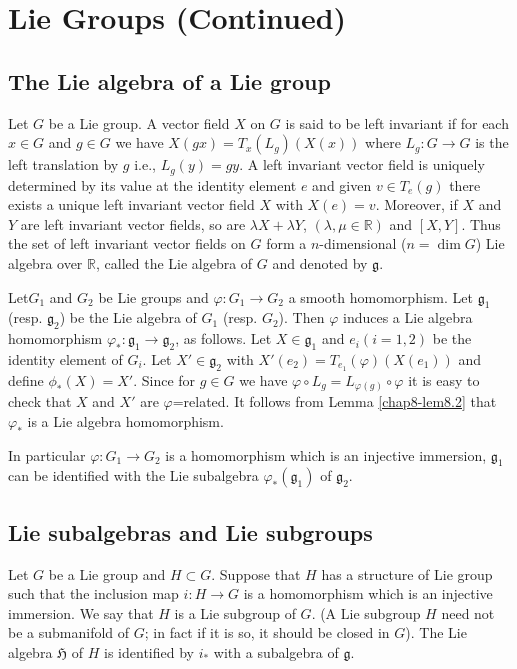 \chapter{Lie Groups (Continued)}\label{chap9}

\section*{The Lie algebra of a Lie group}

Let $G$ be a Lie group. A vector field $X$ on $G$ is said to be left invariant if for each $x\in G$ and $g\in G$ we have $X(gx)=T_{x}(L_{g})(X(x))$ where $L_{g}:G\to G$ is the left translation by $g$ i.e., $L_{g}(y)=gy$. A left invariant vector field is uniquely determined by its value at the identity element $e$ and given $v\in T_{e}(g)$ there exists a unique left invariant vector field $X$ with $X(e)=v$. Moreover, if $X$ and $Y$ are left invariant vector fields, so are $\lambda X+\lambda Y$, $(\lambda,\mu\in \mathbb{R})$ and $[X,Y]$. Thus the set of left invariant vector fields on $G$ form a $n$-dimensional ($n=\dim G$) Lie algebra over $\mathbb{R}$, called the Lie algebra of $G$ and denoted by $\mathfrak{g}$.

Let\pageoriginale $G_{1}$ and $G_{2}$ be Lie groups and $\varphi:G_{1}\to G_{2}$ a smooth homomorphism. Let $\mathfrak{g}_{1}$ (resp. $\mathfrak{g}_{2}$) be the Lie algebra of $G_{1}$ (resp. $G_{2}$). Then $\varphi$ induces a Lie algebra homomorphism $\varphi_{*}:\mathfrak{g}_{1}\to \mathfrak{g}_{2}$, as follows. Let $X\in \mathfrak{g}_{1}$ and $e_{i}(i=1,2)$ be the identity element of $G_{i}$. Let $X'\in \mathfrak{g}_{2}$ with $X'(e_{2})=T_{e_{1}}(\varphi)(X(e_{1}))$ and define $\phi_{*}(X)=X'$. Since for $g\in G$ we have $\varphi\circ L_{g}=L_{\varphi(g)}\circ \varphi$ it is easy to check that $X$ and $X'$ are $\varphi$=related. It follows from Lemma \ref{chap8-lem8.2} that $\varphi_{*}$ is a Lie algebra homomorphism.

In particular $\varphi:G_{1}\to G_{2}$ is a homomorphism which is an injective immersion, $\mathfrak{g}_{1}$ can be identified with the Lie subalgebra $\varphi_{*}(\mathfrak{g}_{1})$ of $\mathfrak{g}_{2}$.

\section*{Lie subalgebras and Lie subgroups}

Let $G$ be a Lie group and $H\subset G$. Suppose that $H$ has a structure of Lie group such that the inclusion map $i:H\to G$ is a homomorphism which is an injective immersion. We say that $H$ is a Lie subgroup of $G$. (A Lie subgroup $H$ need not be a submanifold of $G$; in fact if it is so, it should be closed in $G$). The Lie algebra $\mathfrak{H}$ of $H$ is identified by $i_{*}$ with a subalgebra of $\mathfrak{g}$.

